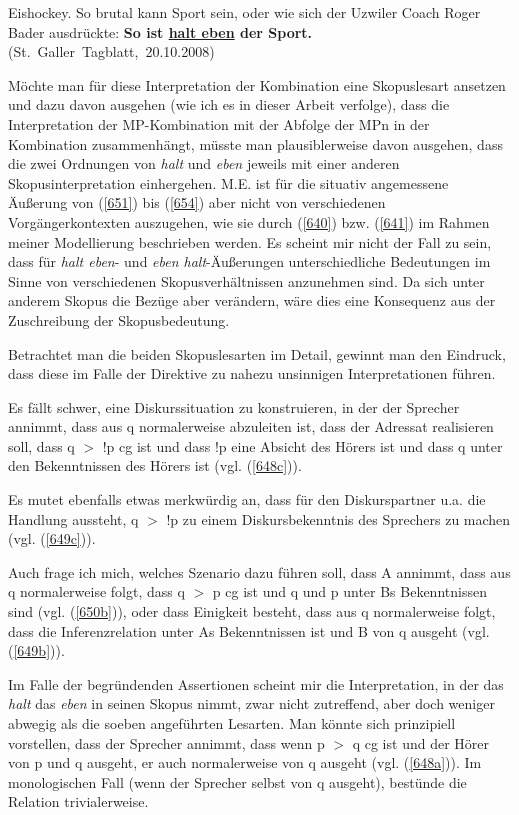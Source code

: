 \begin{exe}
	\ex\label{654} 
	Eishockey. So brutal kann Sport sein, oder wie sich der Uzwiler Coach Roger Bader ausdrückte:  \textbf{So ist 					\underline{halt eben} der Sport.}    
	\newline
	\hbox{}\hfill\hbox {(St. Galler Tagblatt, 20.10.2008)}
\end{exe}	                             
Möchte man für diese Interpretation der Kombination eine Skopuslesart ansetzen und dazu davon ausgehen (wie ich es in dieser Arbeit verfolge), dass die Interpretation der MP-Kombination mit der Abfolge der MPn in der Kombination zusammenhängt, müsste man plausiblerweise davon ausgehen, dass die zwei Ordnungen von \textit{halt} und \textit{eben} jeweils mit einer anderen Skopusinterpretation einhergehen. M.E. ist für die situativ angemessene Äußerung von (\ref{651}) bis (\ref{654}) aber nicht von verschiedenen Vorgängerkontexten auszugehen, wie sie durch (\ref{640}) bzw. (\ref{641}) im Rahmen meiner Modellierung beschrieben werden. Es scheint mir nicht der Fall zu sein, dass für \textit{halt eben}- und \textit{eben halt}-Äußerungen unterschiedliche Bedeutungen im Sinne von verschiedenen Skopusverhältnissen anzunehmen sind. Da sich unter anderem Skopus die Bezüge aber verändern, wäre dies eine Konsequenz aus der Zuschreibung der Skopusbedeutung. 

Betrachtet man die beiden Skopuslesarten im Detail, gewinnt man den Eindruck, dass diese im Falle der Direktive zu nahezu unsinnigen Interpretationen führen. 
	                    
Es fällt schwer, eine Diskurssituation zu konstruieren, in der der Sprecher annimmt, dass aus q normalerweise abzuleiten ist, dass der Adressat realisieren soll, dass q $>$ !p cg ist und dass !p eine Absicht des Hörers ist und dass q unter den Bekenntnissen des Hörers ist (vgl. (\ref{648c})).

Es mutet ebenfalls etwas merkwürdig an, dass für den Diskurspartner u.a. die Handlung aussteht, q $>$ !p zu einem Diskursbekenntnis des Sprechers zu machen (vgl. (\ref{649c})).

Auch frage ich mich, welches Szenario dazu führen soll, dass A annimmt, dass aus q normalerweise folgt, dass q $>$ p cg ist und q und p unter Bs Bekenntnissen sind (vgl. (\ref{650b})), oder dass Einigkeit besteht, dass aus q normalerweise folgt, dass die Inferenzrelation unter As Bekenntnissen ist und B von q ausgeht (vgl. (\ref{649b})).

Im Falle der begründenden Assertionen scheint mir die Interpretation, in der das \textit{halt} das \textit{eben} in seinen Skopus nimmt, zwar nicht zutreffend, aber doch weniger abwegig als die soeben angeführten Lesarten. Man könnte sich prinzi\-piell vorstellen, dass der Sprecher annimmt, dass wenn p $>$ q cg ist und der Hörer von p und q ausgeht, er auch normalerweise von q ausgeht (vgl. (\ref{648a})). Im monologischen Fall (wenn der Sprecher selbst von q ausgeht), bestünde die Relation trivialerweise.

